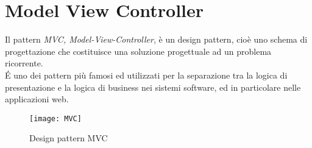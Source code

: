 \section{Model View Controller}
\label{sec:MVC}
Il pattern \emph{MVC, Model-View-Controller}, è un design pattern, cioè uno schema di progettazione che costituisce una soluzione progettuale ad un problema ricorrente.\\
\'E uno dei pattern più famosi ed utilizzati per la separazione tra la logica di presentazione e la logica di business nei sistemi software, ed in particolare nelle applicazioni web.\\
\begin{figure}[h]
	\centering
	\texttt{[image: MVC]}
	\caption{Design pattern MVC}
	\label{mvc-schema}
\end{figure}


\newpage